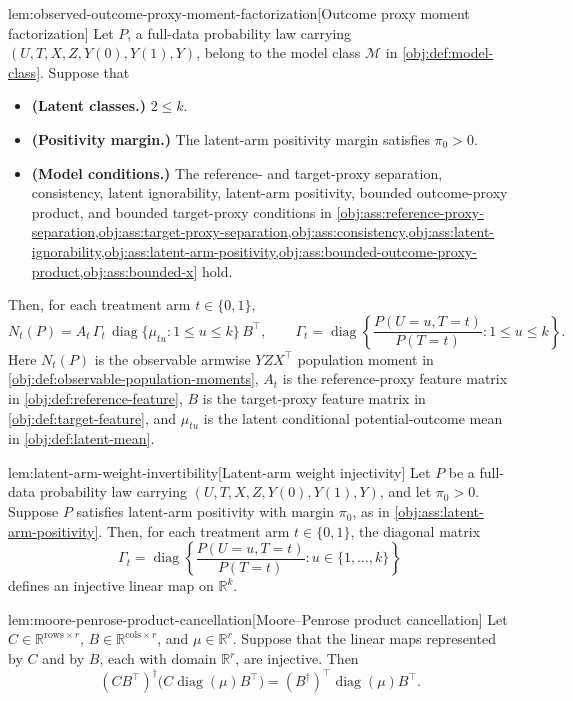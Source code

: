 \begin{lemmav}{lem:observed-outcome-proxy-moment-factorization}[Outcome proxy moment factorization]
Let \(P\), a full-data probability law carrying \((U,T,X,Z,Y(0),Y(1),Y)\), belong to the model class \(\mathcal M\) in \cref{obj:def:model-class}. Suppose that
\begin{itemize}
\item \textbf{(Latent classes.)} \(2\le k\).
\item \textbf{(Positivity margin.)} The latent-arm positivity margin satisfies \(\pi_0>0\).
\item \textbf{(Model conditions.)} The reference- and target-proxy separation, consistency, latent ignorability, latent-arm positivity, bounded outcome-proxy product, and bounded target-proxy conditions in \cref{obj:ass:reference-proxy-separation,obj:ass:target-proxy-separation,obj:ass:consistency,obj:ass:latent-ignorability,obj:ass:latent-arm-positivity,obj:ass:bounded-outcome-proxy-product,obj:ass:bounded-x} hold.
\end{itemize}
Then, for each treatment arm \(t\in\{0,1\}\),
\[
N_t(P)
=
A_t\,\Gamma_t\,\operatorname{diag}\{\mu_{tu}:1\le u\le k\}\,B^\top,
\qquad
\Gamma_t
=
\operatorname{diag}\left\{\frac{P(U=u,T=t)}{P(T=t)}:1\le u\le k\right\}.
\]
Here \(N_t(P)\) is the observable armwise \(YZX^\top\) population moment in \cref{obj:def:observable-population-moments}, \(A_t\) is the reference-proxy feature matrix in \cref{obj:def:reference-feature}, \(B\) is the target-proxy feature matrix in \cref{obj:def:target-feature}, and \(\mu_{tu}\) is the latent conditional potential-outcome mean in \cref{obj:def:latent-mean}.
\end{lemmav}

\begin{lemmav}{lem:latent-arm-weight-invertibility}[Latent-arm weight injectivity]
Let \(P\) be a full-data probability law carrying \((U,T,X,Z,Y(0),Y(1),Y)\), and let \(\pi_0>0\). Suppose \(P\) satisfies latent-arm positivity with margin \(\pi_0\), as in \cref{obj:ass:latent-arm-positivity}. Then, for each treatment arm \(t\in\{0,1\}\), the diagonal matrix
\[
\Gamma_t
=
\operatorname{diag}\left\{
\frac{P(U=u,T=t)}{P(T=t)}
: u\in\{1,\ldots,k\}
\right\}
\]
defines an injective linear map on \(\mathbb R^k\).
\end{lemmav}

\begin{lemmav}{lem:moore-penrose-product-cancellation}[Moore--Penrose product cancellation]
Let \(C\in\mathbb R^{\mathrm{rows}\times r}\), \(B\in\mathbb R^{\mathrm{cols}\times r}\), and \(\mu\in\mathbb R^r\). Suppose that the linear maps represented by \(C\) and by \(B\), each with domain \(\mathbb R^r\), are injective. Then
\[
(CB^\top)^\dagger\bigl(C\operatorname{diag}(\mu)B^\top\bigr)
=
(B^\dagger)^\top \operatorname{diag}(\mu)B^\top .
\]
\end{lemmav}


